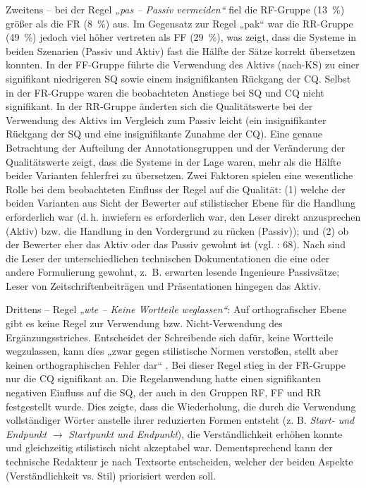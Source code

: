 Zweitens -- bei der Regel \textit{„pas -- Passiv vermeiden“} fiel die RF-Gruppe (13~\%) größer als die FR (8~\%) aus. Im Gegensatz zur Regel „pak“ war die RR-Gruppe (49~\%) jedoch viel höher vertreten als FF (29~\%), was zeigt, dass die Systeme in beiden Szenarien (Passiv und Aktiv) fast die Hälfte der Sätze korrekt übersetzen konnten. In der FF-Gruppe führte die Verwendung des Aktivs (nach-KS) zu einer signifikant niedrigeren SQ sowie einem insignifikanten Rückgang der CQ. Selbst in der FR-Gruppe waren die beobachteten Anstiege bei SQ und CQ nicht signifikant. In der RR-Gruppe änderten sich die Qualitätswerte bei der Verwendung des Aktivs im Vergleich zum Passiv leicht (ein insignifikanter Rückgang der SQ und eine insignifikante Zunahme der CQ). Eine genaue Betrachtung der Aufteilung der Annotationsgruppen und der Veränderung der Qualitätswerte zeigt, dass die Systeme in der Lage waren, mehr als die Hälfte beider Varianten fehlerfrei zu übersetzen. Zwei Faktoren spielen eine wesentliche Rolle bei dem beobachteten Einfluss der Regel auf die Qualität: (1) welche der beiden Varianten aus Sicht der Bewerter auf stilistischer Ebene für die Handlung erforderlich war (d.\,h. inwiefern es erforderlich war, den Leser direkt anzusprechen (Aktiv) bzw. die Handlung in den Vordergrund zu rücken (Passiv)); und (2) ob der Bewerter eher das Aktiv oder das Passiv gewohnt ist (vgl. \citealt{BaumertVerhein-Jarren2012}: 68). Nach \citet[68f.]{BaumertVerhein-Jarren2012} sind die Leser der unterschiedlichen technischen Dokumentationen die eine oder andere Formulierung gewohnt, z.~B. erwarten lesende Ingenieure Passivsätze; Leser von Zeitschriftenbeiträgen und Präsentationen hingegen das Aktiv.

Drittens -- Regel \textit{„wte -- Keine Wortteile weglassen“}: Auf orthografischer Ebene gibt es keine Regel zur Verwendung bzw. Nicht-Verwendung des Ergänzungsstriches. Entscheidet der Schreibende sich dafür, keine Wortteile wegzulassen, kann dies „zwar gegen stilistische Normen verstoßen, stellt aber keinen orthographischen Fehler dar“ \citep[191]{Nerius2007}. Bei dieser Regel stieg in der FR-Gruppe nur die CQ signifikant an. Die Regelanwendung hatte einen signifikanten negativen Einfluss auf die SQ, der auch in den Gruppen RF, FF und RR festgestellt wurde. Dies zeigte, dass die Wiederholung, die durch die Verwendung vollständiger Wörter anstelle ihrer reduzierten Formen entsteht (z. B. \textit{Start- und Endpunkt} $\to$ \textit{Startpunkt und Endpunkt}), die Verständlichkeit erhöhen konnte und gleichzeitig stilistisch nicht akzeptabel war. Dementsprechend kann der technische Redakteur je nach Textsorte entscheiden, welcher der beiden Aspekte (Verständlichkeit vs. Stil) priorisiert werden soll.

